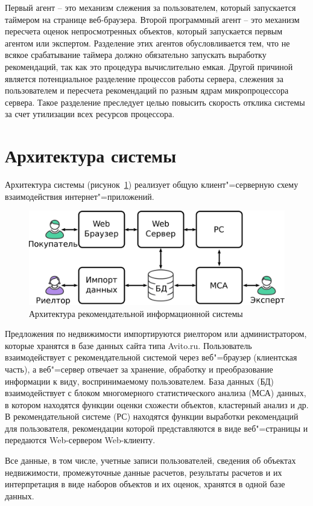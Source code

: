 \documentclass[a4paper,14pt,openany,final]{extreport} %
\def\oldcaption{} \let\oldcaption=\caption
\def\caption{\stepcounter{captionsnum}\oldcaption}
\begin{document}
Первый агент -- это механизм слежения за пользователем, который запускается таймером на странице веб-браузера. Второй программный агент -- это механизм пересчета оценок непросмотренных объектов, который запускается первым агентом или экспертом. Разделение этих агентов обусловливается тем, что не всякое срабатывание таймера должно обязательно запускать выработку рекомендаций, так как это процедура вычислительно емкая.  Другой причиной является потенциальное разделение процессов работы сервера, слежения за пользователем и пересчета рекомендаций по разным ядрам микропроцессора сервера. Такое разделение преследует целью повысить скорость отклика системы за счет утилизации всех ресурсов процессора.

\section{Архитектура системы}
Архитектура системы (рисунок~\ref{fig:architecture}) реализует общую клиент"=серверную схему взаимодействия интернет"=приложений.
\begin{figure}[htbp]
  \centering
  \includegraphics[width=0.7\linewidth]{architecture.pdf}
  \caption{Архитектура рекомендательной информационной системы}
  \label{fig:architecture}
\end{figure}

Предложения по недвижимости импортируются риелтором или администратором, которые хранятся в базе данных сайта типа Avito.ru. Пользователь взаимодействует с рекомендательной системой через веб"=браузер (клиентская часть), а веб"=сервер отвечает за хранение, обработку и преобразование информации к виду, воспринимаемому пользователем. База данных (БД) взаимодействует с блоком многомерного статистического анализа (МСА) данных, в котором находятся функции оценки схожести объектов, кластерный анализ и др. В рекомендательной системе (РС) находятся функции выработки рекомендаций для пользователя, рекомендации которой представляются в виде веб"=страницы и передаются Web-сервером Web-клиенту.

Все данные, в том числе, учетные записи пользователей, сведения об объектах недвижимости, промежуточные данные расчетов, результаты расчетов и их интерпретация в виде наборов объектов и их оценок, хранятся в одной базе данных.
\end{document}
